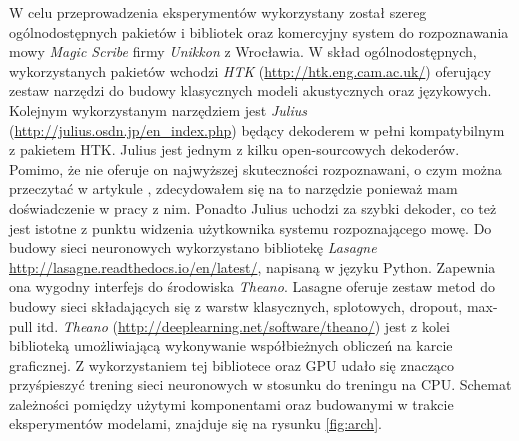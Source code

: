 \documentclass[11pt]{article}
\begin{document}
	W celu przeprowadzenia eksperymentów wykorzystany został szereg ogólnodostępnych pakietów i bibliotek oraz komercyjny system do rozpoznawania mowy \textit{Magic Scribe} firmy \textit{Unikkon} z Wrocławia. W skład ogólnodostępnych, wykorzystanych pakietów wchodzi \textit{HTK} (\url{http://htk.eng.cam.ac.uk/}) oferujący zestaw narzędzi do budowy klasycznych modeli akustycznych oraz językowych. Kolejnym wykorzystanym narzędziem jest \textit{Julius} (\url{http://julius.osdn.jp/en_index.php}) będący dekoderem w pełni kompatybilnym z pakietem HTK. Julius jest jednym z kilku open-sourcowych dekoderów. Pomimo, że nie oferuje on najwyższej skuteczności rozpoznawani, o czym można przeczytać w artykule \cite{asr_toolkit_cmp}, zdecydowałem się na to narzędzie ponieważ mam doświadczenie w pracy z nim. Ponadto Julius uchodzi za szybki dekoder, co też jest istotne z punktu widzenia użytkownika systemu rozpoznającego mowę. Do budowy sieci neuronowych wykorzystano bibliotekę \textit{Lasagne} \url{http://lasagne.readthedocs.io/en/latest/}, napisaną w języku Python. Zapewnia ona wygodny interfejs do środowiska \textit{Theano}. Lasagne oferuje zestaw metod do budowy sieci składających się z warstw klasycznych, splotowych, dropout, max-pull itd. \textit{Theano} (\url{http://deeplearning.net/software/theano/}) jest z kolei biblioteką umożliwiającą wykonywanie współbieżnych obliczeń na karcie graficznej. Z wykorzystaniem tej bibliotece oraz GPU udało się znacząco przyśpieszyć trening sieci neuronowych w stosunku do treningu na CPU. Schemat zależności pomiędzy użytymi komponentami oraz budowanymi w trakcie eksperymentów modelami, znajduje się na rysunku \ref{fig:arch}. 
	
\end{document}
